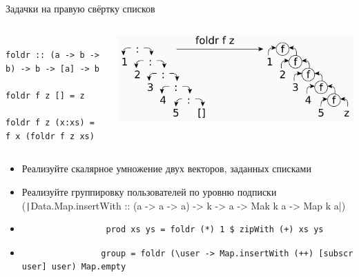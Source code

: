     \begin{frame}[fragile]{Задачки на правую свёртку списков}
        \vspace{-1em}
        \begin{columns}[onlytextwidth]
            \begin{column}{0.485\textwidth}
                \begin{verbatim}
                    foldr :: (a -> b -> b) -> b -> [a] -> b
                    foldr f z [] = z
                    foldr f z (x:xs) = f x (foldr f z xs)
                \end{verbatim}
            \end{column}\hfill%
            \begin{column}{0.5\textwidth}
                \begin{center}
                    \includegraphics[width=1\textwidth]{figs/foldr}
                \end{center}
            \end{column}
        \end{columns}
        \vspace{0.5em}
        \begin{itemize}
            \item[\todo] Реализуйте скалярное умножение двух векторов, заданных списками
            \item[\todo] Реализуйте группировку пользователей по уровню подписки (\texttt|Data.Map.insertWith :: (a -> a -> a) -> k -> a -> Mak k a -> Map k a|)
            \item[\answer] \pause
             \begin{verbatim}
                 prod xs ys = foldr (*) 1 $ zipWith (+) xs ys
             \end{verbatim}
            \item[\answer] \pause
            \begin{verbatim}
                group = foldr (\user -> Map.insertWith (++) [subscr user] user) Map.empty
            \end{verbatim}
        \end{itemize}
    \end{frame}

